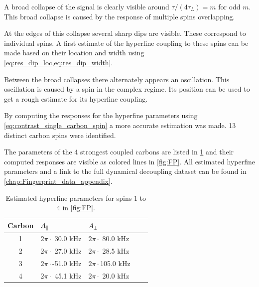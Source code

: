 A broad collapse of the signal is clearly visible around $\tau/(4\tau_L) = m$ for odd $m$.
This broad collapse is caused by the response of multiple spins overlapping.

At the edges of this collapse several sharp dips are visible.
These correspond to individual spins.
A first estimate of the hyperfine coupling to these spins can be made based on their location and width using \cref{eq:res_dip_loc,eq:res_dip_width}.

Between the broad collapses there alternately appears an oscillation.
This oscillation is caused by a spin in the complex regime.
Its position can be used to get a rough estimate for its hyperfine coupling.

By computing the responses for the hyperfine parameters using \cref{eq:contrast_single_carbon_spin} a more accurate estimation was made.
13 distinct carbon spins were identified.

The parameters of the 4 strongest coupled carbons are listed in \cref{tbl:HF_par} and their computed responses are visible as colored lines in \cref{fig:FP}.
All estimated hyperfine parameters and a link to the full dynamical decoupling dataset can be found in \cref{chap:Fingerprint_data_appendix}.

\begin{table}[htbp]
\centering
    \caption{Estimated hyperfine parameters for spins 1 to 4 in \cref{fig:FP}.}
    \begin{tabular}{cllll}
    Carbon & \quad \quad  $A_{\parallel} $ & \quad \quad $A_{\perp}$ \\ \hline
    1         & $2 \pi \cdot${ }30.0 kHz             & $2 \pi \cdot${ }80.0 kHz                \\
    2         & $2 \pi \cdot${ }27.0 kHz             & $2 \pi \cdot${ }28.5 kHz              \\
    3         & $2 \pi \cdot$-51.0 kHz          & $2 \pi \cdot$105.0 kHz              \\
    4         & $2 \pi \cdot${ }45.1 kHz           & $2 \pi \cdot${ }20.0 kHz                \\
    \end{tabular}
    \label{tbl:HF_par}
\end{table}

